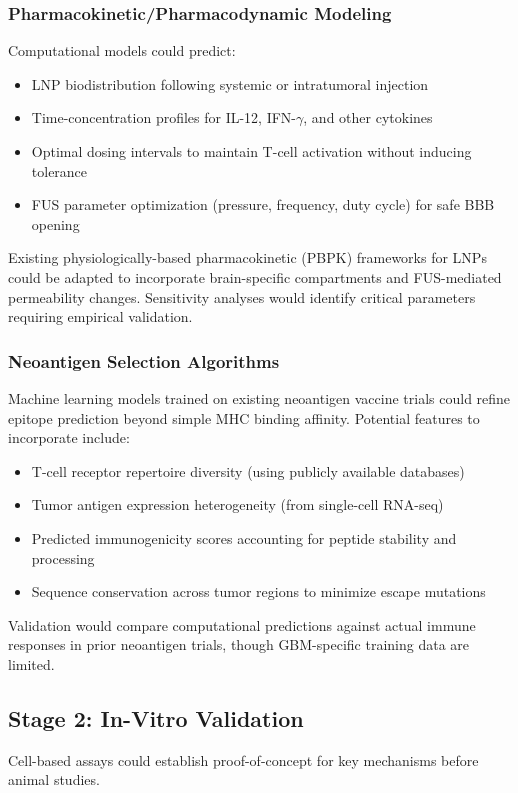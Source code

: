 \documentclass[12pt]{article}
\begin{document}
\subsubsection{Pharmacokinetic/Pharmacodynamic Modeling}
Computational models could predict:
\begin{itemize}[leftmargin=*,noitemsep]
\item LNP biodistribution following systemic or intratumoral injection
\item Time-concentration profiles for IL-12, IFN-$\gamma$, and other cytokines
\item Optimal dosing intervals to maintain T-cell activation without inducing tolerance
\item FUS parameter optimization (pressure, frequency, duty cycle) for safe BBB opening
\end{itemize}

Existing physiologically-based pharmacokinetic (PBPK) frameworks for LNPs could be adapted to incorporate brain-specific compartments and FUS-mediated permeability changes. Sensitivity analyses would identify critical parameters requiring empirical validation.

\subsubsection{Neoantigen Selection Algorithms}
Machine learning models trained on existing neoantigen vaccine trials could refine epitope prediction beyond simple MHC binding affinity. Potential features to incorporate include:
\begin{itemize}[leftmargin=*,noitemsep]
\item T-cell receptor repertoire diversity (using publicly available databases)
\item Tumor antigen expression heterogeneity (from single-cell RNA-seq)
\item Predicted immunogenicity scores accounting for peptide stability and processing
\item Sequence conservation across tumor regions to minimize escape mutations
\end{itemize}

Validation would compare computational predictions against actual immune responses in prior neoantigen trials, though GBM-specific training data are limited.

\subsection{Stage 2: In-Vitro Validation}
Cell-based assays could establish proof-of-concept for key mechanisms before animal studies.
\end{document}
